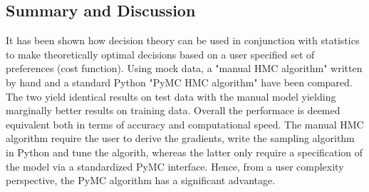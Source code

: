 \begin{example}
	
	\section{Summary and Discussion}	
	It has been shown how decision theory can be used in conjunction with statistics to make theoretically optimal decisions based on a user specified set of preferences (cost function). Using mock data, a "manual HMC algorithm" written by hand and a standard Python "PyMC HMC algorithm" have been compared. The two yield identical results on test data with the manual model yielding marginally better results on training data. Overall the performace is deemed equivalent both in terms of accuracy and computational speed. The manual HMC algorithm require the user to derive the gradients, write the sampling algorithm in Python and tune the algorith, whereas the latter only require a specification of the model via a standardized PyMC interface. Hence, from a user complexity perspective, the PyMC algorithm has a significant advantage.
\end{example}
